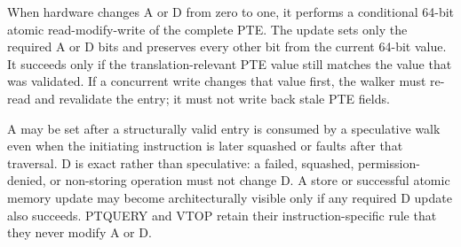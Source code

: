 When hardware changes A or D from zero to one, it performs a conditional 64-bit atomic read-modify-write of the
complete PTE. The update sets only the required A or D bits and preserves every other bit from the current 64-bit
value. It succeeds only if the translation-relevant PTE value still matches the value that was validated. If a
concurrent write changes that value first, the walker must re-read and revalidate the entry; it must not write back
stale PTE fields.

A may be set after a structurally valid entry is consumed by a speculative walk even when the initiating
instruction is later squashed or faults after that traversal. D is exact rather than speculative: a failed,
squashed, permission-denied, or non-storing operation must not change D. A store or successful atomic memory update
may become architecturally visible only if any required D update also succeeds. PTQUERY and VTOP retain their
instruction-specific rule that they never modify A or D.
